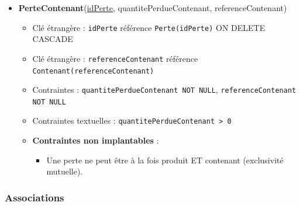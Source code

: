 \begin{itemize}
    \item \textbf{PerteContenant}(\underline{idPerte}, quantitePerdueContenant, referenceContenant)
    \begin{itemize}
        \item Clé étrangère : \texttt{idPerte} référence \texttt{Perte(idPerte)} ON DELETE CASCADE
        \item Clé étrangère : \texttt{referenceContenant} référence \texttt{Contenant(referenceContenant)}
        \item Contraintes : \texttt{quantitePerdueContenant NOT NULL}, \texttt{referenceContenant NOT NULL}
        \item Contraintes textuelles : \texttt{quantitePerdueContenant > 0}
        \item \textbf{Contraintes non implantables} :
        \begin{itemize}
            \item Une perte ne peut être à la fois produit ET contenant (exclusivité mutuelle).
        \end{itemize}
    \end{itemize}
\end{itemize}

\subsubsection{Associations}

